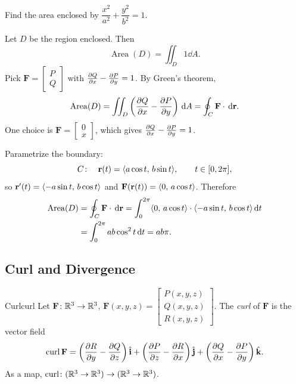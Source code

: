 \begin{example}
  Find the area enclosed by $\dfrac{x^2}{a^2}+\dfrac{y^2}{b^2}=1$.

  Let $D$ be the region enclosed. Then
  \[
    \operatorname{Area}(D) = \iint_D 1\dd{A}.
  \]
  Pick $\mathbf{F}=
    \begin{bmatrix}
      P \\Q
    \end{bmatrix}
  $ with $\frac{\partial Q}{\partial x}-\frac{\partial P}{\partial y}=1$. By Green's theorem,
  \[
    \operatorname{Area}(D)
    = \iint_D \left(\frac{\partial Q}{\partial x}-\frac{\partial P}{\partial y}\right)\,\mathrm{d}A
    = \oint_C \mathbf{F}\cdot\,\mathrm{d}\mathbf{r}.
  \]
  One choice is $\mathbf{F}=
    \begin{bmatrix}
      0 \\x
    \end{bmatrix}
  $, which gives $\frac{\partial Q}{\partial x}-\frac{\partial P}{\partial y}=1$.

  Parametrize the boundary:
  \[
    C\colon\quad \mathbf{r}(t)=\langle a\cos t,\,b\sin t \rangle,\qquad t\in[0,2\pi],
  \]
  so $\mathbf{r}'(t)=\langle -a\sin t,\,b\cos t \rangle$ and $\mathbf{F}(\mathbf{r}(t))=\langle 0,\,a\cos t \rangle$. Therefore
  \begin{align*}
    \operatorname{Area}(D)
     & = \oint_C \mathbf{F}\cdot\,\mathrm{d}\mathbf{r}
    = \int_0^{2\pi}\langle 0,\,a\cos t \rangle\cdot\langle -a\sin t,\,b\cos t \rangle\,\mathrm{d}t \\
     & = \int_0^{2\pi} ab\cos^2 t\,\mathrm{d}t
    = ab\pi.
  \end{align*}

  \begin{center}
  \end{center}
\end{example}

\subsection{Curl and Divergence}

\begin{definition}{Curl}{curl}
  Let $\mathbf{F}\colon\mathbb{R}^3\to\mathbb{R}^3$, $\mathbf{F}(x,y,z)=
    \begin{bmatrix}
      P(x,y,z) \\Q(x,y,z)\\R(x,y,z)
    \end{bmatrix}
  $. The \emph{curl} of $\mathbf{F}$ is the vector field
  \[
    \operatorname{curl}\mathbf{F}
    = \left(\frac{\partial R}{\partial y}-\frac{\partial Q}{\partial z}\right)\hat{\mathbf{i}}
    + \left(\frac{\partial P}{\partial z}-\frac{\partial R}{\partial x}\right)\hat{\mathbf{j}}
    + \left(\frac{\partial Q}{\partial x}-\frac{\partial P}{\partial y}\right)\hat{\mathbf{k}}.
  \]
  As a map, $\operatorname{curl}\colon(\mathbb{R}^3\to\mathbb{R}^3)\to(\mathbb{R}^3\to\mathbb{R}^3)$.
\end{definition}


